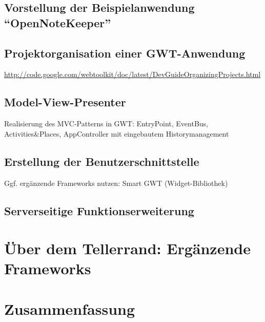 \documentclass[12pt, a4paper, ngerman]{article}
\begin{document}
\subsection{Vorstellung der Beispielanwendung "`OpenNoteKeeper"'}

\subsection{Projektorganisation einer GWT-Anwendung}
\url{http://code.google.com/webtoolkit/doc/latest/DevGuideOrganizingProjects.html}

\subsection{Model-View-Presenter}
Realisierung des MVC-Patterns in GWT:
EntryPoint, EventBus, Activities&Places, AppController mit eingebautem Historymanagement

\subsection{Erstellung der Benutzerschnittstelle}
Ggf. ergänzende Frameworks nutzen: Smart GWT (Widget-Bibliothek)

\subsection{Serverseitige Funktionserweiterung}

\section{Über dem Tellerrand: Ergänzende Frameworks}

\section{Zusammenfassung}
\end{document}
